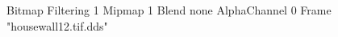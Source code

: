 {Bitmap
	{Filtering 1}
	{Mipmap 1}
	{Blend none}
	{AlphaChannel 0}
	{Frame "housewall12.tif.dds"}
}
